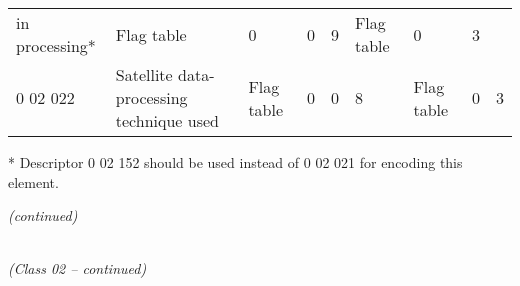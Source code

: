 \begin{longtable}[]{@{}lllllllll@{}}
\begin{minipage}[t]{0.08\columnwidth}
in processing*\strut
\end{minipage} & \begin{minipage}[t]{0.08\columnwidth}\raggedright
Flag table\strut
\end{minipage} & \begin{minipage}[t]{0.08\columnwidth}\raggedright
0\strut
\end{minipage} & \begin{minipage}[t]{0.08\columnwidth}\raggedright
0\strut
\end{minipage} & \begin{minipage}[t]{0.08\columnwidth}\raggedright
9\strut
\end{minipage} & \begin{minipage}[t]{0.08\columnwidth}\raggedright
Flag table\strut
\end{minipage} & \begin{minipage}[t]{0.08\columnwidth}\raggedright
0\strut
\end{minipage} & \begin{minipage}[t]{0.08\columnwidth}\raggedright
3\strut
\end{minipage}\tabularnewline
0 02 022 & Satellite data-processing technique used & Flag table & 0 & 0 & 8 & Flag table & 0 & 3\tabularnewline
\bottomrule
\end{longtable}

* Descriptor 0 02 152 should be used instead of 0 02 021 for encoding this element.

\emph{(continued)}

\emph{\\
(Class 02 -- continued)}

